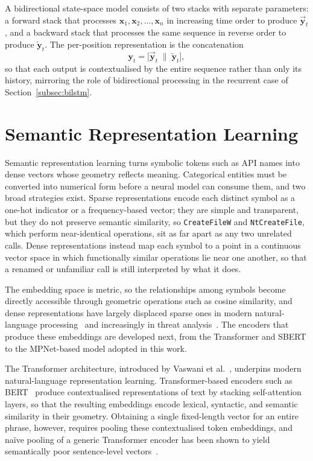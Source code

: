 \documentclass[%
    BCOR=10mm,
    DIV=13,
    toc=bibliography,
    toc=listof,
    oneside,
    12pt,
]{scrbook}
\begin{document}
A bidirectional state-space model consists of two stacks with separate
parameters: a forward stack that processes
$\mathbf{x}_1, \mathbf{x}_2, \ldots, \mathbf{x}_n$ in increasing time order to
produce $\overrightarrow{\mathbf{y}}_t$, and a backward stack that processes the
same sequence in reverse order to produce $\overleftarrow{\mathbf{y}}_t$. The
per-position representation is the concatenation
\begin{equation}
  \mathbf{y}_t = \bigl[ \overrightarrow{\mathbf{y}}_t \;\|\; \overleftarrow{\mathbf{y}}_t \bigr],
  \label{eq:bimamba}
\end{equation}
so that each output is contextualised by the entire sequence rather than only
its history, mirroring the role of bidirectional processing in the recurrent
case of Section~\ref{subsec:bilstm}.
\fi

\section{Semantic Representation Learning}
\label{sec:semantic}

Semantic representation learning turns symbolic tokens such as API names into
dense vectors whose geometry reflects meaning. Categorical entities must be
converted into numerical form before a neural model can consume them, and two
broad strategies exist. Sparse representations encode each distinct symbol as a
one-hot indicator or a frequency-based vector; they are simple and transparent,
but they do not preserve semantic similarity, so \texttt{CreateFileW} and
\texttt{NtCreateFile}, which perform near-identical operations, sit as far apart
as any two unrelated calls. Dense representations instead map each symbol to a
point in a continuous vector space in which functionally similar operations lie
near one another, so that a renamed or unfamiliar call is still interpreted by
what it does.

The embedding space is metric, so the relationships among symbols become
directly accessible through geometric operations such as cosine similarity, and
dense representations have largely displaced sparse ones in modern
natural-language processing~\cite{reimers2019sbert} and increasingly in threat
analysis~\cite{amer2025graphshield}. The encoders that produce these embeddings
are developed next, from the Transformer and SBERT to the MPNet-based model
adopted in this work.

The Transformer architecture, introduced by Vaswani et al.~\cite{vaswani2017},
underpins modern natural-language representation learning. Transformer-based
encoders such as BERT~\cite{devlin2019bert} produce contextualised
representations of text by stacking self-attention layers, so that the resulting
embeddings encode lexical, syntactic, and semantic similarity in their geometry.
Obtaining a single fixed-length vector for an entire phrase, however, requires
pooling these contextualised token embeddings, and na\"ive pooling of a generic
Transformer encoder has been shown to yield semantically poor sentence-level
vectors~\cite{reimers2019sbert}.
\end{document}
